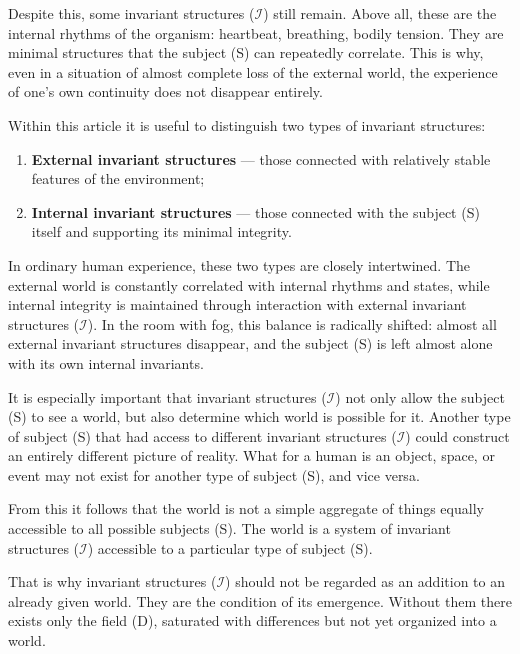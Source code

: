 \documentclass[aps,prd,onecolumn,nofootinbib,superscriptaddress]{revtex4-2}
\begin{document}
Despite this, some invariant structures ($\mathcal{I}$) still remain. Above all, these are the internal rhythms of the organism: heartbeat, breathing, bodily tension. They are minimal structures that the subject (S) can repeatedly correlate. This is why, even in a situation of almost complete loss of the external world, the experience of one’s own continuity does not disappear entirely.

Within this article it is useful to distinguish two types of invariant structures:

\begin{enumerate}
    \item \textbf{External invariant structures} --- those connected with relatively stable features of the environment;

    \item \textbf{Internal invariant structures} --- those connected with the subject (S) itself and supporting its minimal integrity.
\end{enumerate}

In ordinary human experience, these two types are closely intertwined. The external world is constantly correlated with internal rhythms and states, while internal integrity is maintained through interaction with external invariant structures ($\mathcal{I}$). In the room with fog, this balance is radically shifted: almost all external invariant structures disappear, and the subject (S) is left almost alone with its own internal invariants.

It is especially important that invariant structures ($\mathcal{I}$) not only allow the subject (S) to see a world, but also determine which world is possible for it. Another type of subject (S) that had access to different invariant structures ($\mathcal{I}$) could construct an entirely different picture of reality. What for a human is an object, space, or event may not exist for another type of subject (S), and vice versa.

From this it follows that the world is not a simple aggregate of things equally accessible to all possible subjects (S). The world is a system of invariant structures ($\mathcal{I}$) accessible to a particular type of subject (S).

That is why invariant structures ($\mathcal{I}$) should not be regarded as an addition to an already given world. They are the condition of its emergence. Without them there exists only the field (D), saturated with differences but not yet organized into a world.
\end{document}
